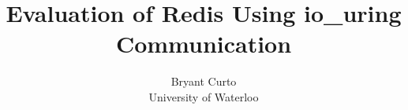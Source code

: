 \documentclass[sigconf]{acmart}
\begin{document}
\title{Evaluation of Redis Using io\_uring Communication}

\author{Bryant Curto\\
University of Waterloo}
















\end{document}

